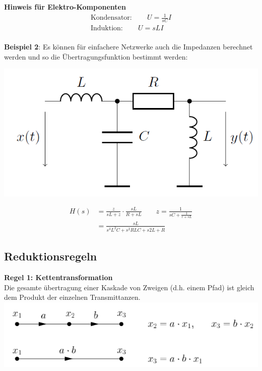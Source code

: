 \noindent\textbf{Hinweis für Elektro-Komponenten}
\begin{align*}
	\text{Kondensator}: \qquad U = \frac{1}{s C}I \\
	\text{Induktion}: \qquad U = s L I \\
\end{align*}

\noindent\textbf{Beispiel 2}: Es können für einfachere Netzwerke auch die Impedanzen berechnet werden und so die Übertragungsfunktion bestimmt werden:\\
\begin{center}
	\includegraphics[width=0.8\columnwidth]{Images/sfd_beispiel_adv2}
\end{center}
\begin{align*}
	H(s) &= \frac{z}{sL + z} \cdot \frac{sL}{R + sL}  \qquad z = \frac{1}{sC + \frac{1}{r+ sL}}\\
	&= \frac{sL}{s^3L^2C + s^2RLC + s2L + R}
\end{align*}


\newpage
\subsection{Reduktionsregeln}
\noindent\textbf{Regel 1: Kettentransformation}\\
 Die gesamte übertragung einer Kaskade von Zweigen (d.h. einem Pfad) ist gleich dem Produkt der einzelnen Transmittanzen.\\
\includegraphics[width=\columnwidth]{Images/sfd_r1}~\\

